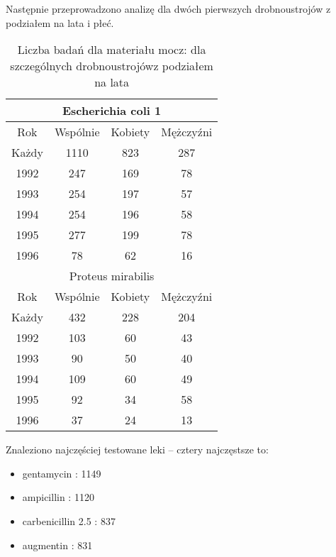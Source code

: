 \documentclass[a4paper,11pt]{article}
\begin{document}
Następnie przeprowadzono analizę dla dwóch pierwszych drobnoustrojów z podziałem na lata i płeć.

\begin{table}[H]
  \begin{center}
  \caption{Liczba badań dla materiału mocz: dla szczególnych drobnoustrojówz podziałem na lata}
  \begin{tabular}{|c|c|c|c|}
    \hline
    \multicolumn{4}{|c|}{Escherichia coli 1} \\ 
    \hline Rok &Wspólnie & Kobiety & Mężczyźni \\ \hline
    Każdy& 1110& 823& 287 \\ \hline 
    1992& 247& 169& 78 \\ \hline
    1993& 254& 197& 57 \\ \hline
    1994& 254& 196& 58 \\ \hline
    1995& 277& 199& 78 \\ \hline
    1996& 78& 62& 16 \\ \hline

    \multicolumn{4}{|c|}{Proteus mirabilis} \\ \hline
    Rok &Wspólnie & Kobiety & Mężczyźni \\ \hline
    Każdy& 432& 228& 204 \\ \hline 
    1992& 103& 60& 43 \\ \hline
    1993& 90& 50& 40 \\ \hline
    1994& 109& 60& 49 \\ \hline
    1995& 92& 34& 58 \\ \hline
    1996& 37& 24& 13 \\ \hline
  \end{tabular}
\end{center}
\end{table}

\newpage
Znaleziono najczęściej testowane leki – cztery najczęstsze to:
\begin{itemize}
  \item gentamycin : 1149
  \item ampicillin : 1120
  \item carbenicillin 2.5 : 837
  \item augmentin : 831
\end{itemize}
\end{document}
